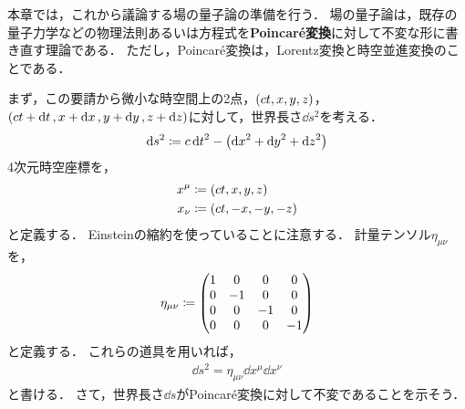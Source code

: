 \documentclass{report}
\begin{document}
  本章では，これから議論する場の量子論の準備を行う．
  場の量子論は，既存の量子力学などの物理法則あるいは方程式を\textbf{Poincar\'e変換}に対して不変な形に書き直す理論である．
  ただし，Poincar\'e変換は，Lorentz変換と時空並進変換のことである．
  \par
  まず，この要請から微小な時空間上の2点，$\qty(ct, x, y, z)$，$\qty(ct + \dd{t}, x + \dd{x}, y + \dd{y}, z + \dd{z})$に対して，世界長さ$\dd{s^2}$を考える．
  \begin{align}
    \dd{s^2} \coloneqq c\dd{t}^2 - \qty(\dd{x}^2 + \dd{y}^2 + \dd{z}^2)
  \end{align}
  4次元時空座標を，
  \begin{align}
    x^{\mu} &\coloneqq \qty(ct, x, y, z) \\ 
    x_{\nu} &\coloneqq \qty(ct, -x, -y, -z)
  \end{align}
  と定義する．
  Einsteinの縮約を使っていることに注意する．
  計量テンソル$\eta_{\mu\nu}$を，
  \begin{align}
    \eta_{\mu\nu} \coloneqq \mqty(
      1 & 0 & 0 & 0 \\ 
      0 & -1 & 0 & 0 \\ 
      0 & 0 & -1 & 0 \\ 
      0 & 0 & 0 & -1
    )
  \end{align}
  と定義する．
  これらの道具を用いれば，
  \begin{align}
    \dd{s^2} = \eta_{\mu\nu}\dd{x^{\mu}}\dd{x^{\nu}}
  \end{align}
  と書ける．
  さて，世界長さ$\dd{s}$がPoincar\'e変換に対して不変であることを示そう．
\end{document}
